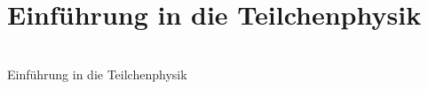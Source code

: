 \section{Einführung in die Teilchenphysik}
\begin{frame}[plain]
   \begin{center} 
  \huge{   }\\
   \Large{Einführung in die Teilchenphysik}
\end{center}
\end{frame}

